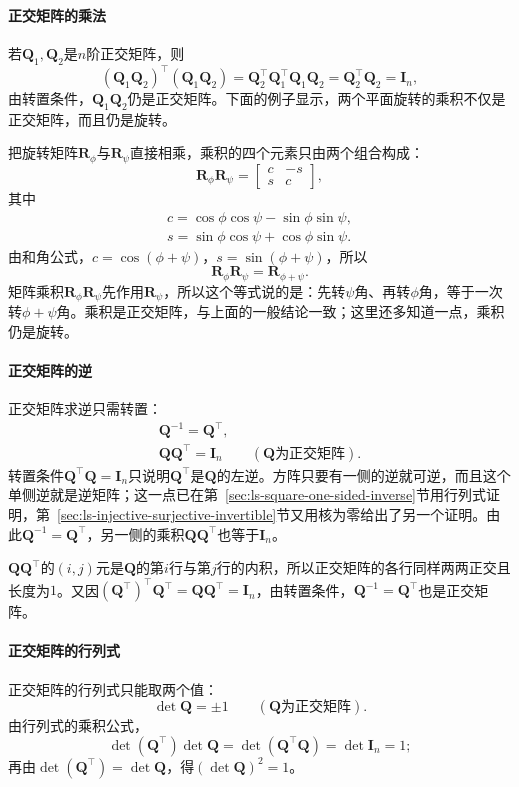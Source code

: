 \paragraph{正交矩阵的乘法}
若$\bm Q_1,\bm Q_2$是$n$阶正交矩阵，则
\[
 (\bm Q_1\bm Q_2)^\top(\bm Q_1\bm Q_2)=\bm Q_2^\top\bm Q_1^\top\bm Q_1\bm Q_2=\bm Q_2^\top\bm Q_2=\bm I_n,
\]
由转置条件，$\bm Q_1\bm Q_2$仍是正交矩阵。下面的例子显示，两个平面旋转的乘积不仅是正交矩阵，而且仍是旋转。
\begin{example}[两个平面旋转的乘积]
\label{ex:ls-rotation-composition}
把旋转矩阵$\bm R_\phi$与$\bm R_\psi$直接相乘，乘积的四个元素只由两个组合构成：
\[
 \bm R_\phi\bm R_\psi=\begin{bmatrix}c&-s\\s&c\end{bmatrix},
\]
其中
\[
 \begin{gathered}
 c=\cos\phi\cos\psi-\sin\phi\sin\psi,\\
 s=\sin\phi\cos\psi+\cos\phi\sin\psi.
 \end{gathered}
\]
由和角公式，$c=\cos(\phi+\psi)$，$s=\sin(\phi+\psi)$，所以
\[
 \bm R_\phi\bm R_\psi=\bm R_{\phi+\psi}.
\]
矩阵乘积$\bm R_\phi\bm R_\psi$先作用$\bm R_\psi$，所以这个等式说的是：先转$\psi$角、再转$\phi$角，等于一次转$\phi+\psi$角。乘积是正交矩阵，与上面的一般结论一致；这里还多知道一点，乘积仍是旋转。
\end{example}

\paragraph{正交矩阵的逆}
正交矩阵求逆只需转置：
\[
\begin{gathered}
\bm Q^{-1}=\bm Q^\top,\\
\bm Q\bm Q^\top=\bm I_n\qquad(\bm Q\text{为正交矩阵}).
\end{gathered}
\]
转置条件$\bm Q^\top\bm Q=\bm I_n$只说明$\bm Q^\top$是$\bm Q$的左逆。方阵只要有一侧的逆就可逆，而且这个单侧逆就是逆矩阵；这一点已在第~\ref{sec:ls-square-one-sided-inverse}节用行列式证明，第~\ref{sec:ls-injective-surjective-invertible}节又用核为零给出了另一个证明。由此$\bm Q^{-1}=\bm Q^\top$，另一侧的乘积$\bm Q\bm Q^\top$也等于$\bm I_n$。

$\bm Q\bm Q^\top$的$(i,j)$元是$\bm Q$的第$i$行与第$j$行的内积，所以正交矩阵的各行同样两两正交且长度为$1$。又因$(\bm Q^\top)^\top\bm Q^\top=\bm Q\bm Q^\top=\bm I_n$，由转置条件，$\bm Q^{-1}=\bm Q^\top$也是正交矩阵。

\paragraph{正交矩阵的行列式}
正交矩阵的行列式只能取两个值：
\[
 \det\bm Q=\pm1\qquad(\bm Q\text{为正交矩阵}).
\]
由行列式的乘积公式，
\[
 \det(\bm Q^\top)\det\bm Q=\det(\bm Q^\top\bm Q)=\det\bm I_n=1;
\]
再由$\det(\bm Q^\top)=\det\bm Q$，得$(\det\bm Q)^2=1$。

